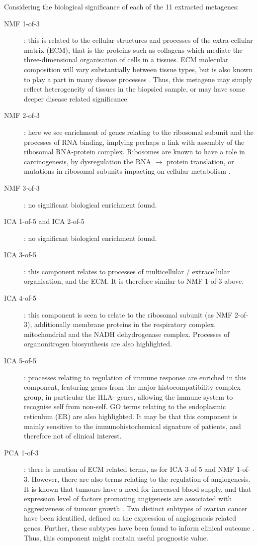 \documentclass[draft, tikz, 12pt,a4paper,oneside,fleqn]{article}
\begin{document}
Considering the biological significance of each of the 11 extracted metagenes:
\begin{description}
%
\item[NMF 1-of-3]: this is related to the cellular structures and processes of the extra-cellular matrix (ECM), that is the proteins such as collagens which mediate the three-dimensional organisation of cells in a tissues.  ECM molecular composition will vary substantially between tissue types, but is also known to play a part in many disease processes \cite{Theocharis2019}.  Thus, this metagene may simply reflect heterogeneity of tissues in the biopsied sample, or may have some deeper disease related significance.
%
\item[NMF 2-of-3]: here we see enrichment of genes relating to the ribosomal subunit and the processes of RNA binding, implying perhaps a link with assembly of the ribosomal RNA-protein complex.   Ribosomes are known to have a role in carcinogenesis, by dysregulation the RNA $\rightarrow$ protein translation, or mutations in ribosomal subunits impacting on cellular metabolism \cite{Sulima2017}.
%
\item[NMF 3-of-3]: no significant biological enrichment found.
%
\item[ICA 1-of-5 and ICA 2-of-5]: no significant biological enrichment found.
%
\item[ICA 3-of-5]: this component relates to processes of multicellular / extracellular organisation, and the ECM.  It is therefore similar to NMF 1-of-3 above.
\item[ICA 4-of-5]: this component is seen to relate to the ribosomal subunit (as NMF 2-of-3), additionally membrane proteins in the respiratory complex, mitochondrial and the NADH dehydrogenase complex.  Processes of organonitrogen biosynthesis are also highlighted. 
%
\item[ICA 5-of-5]: processes relating to regulation of immune response are enriched in this component, featuring genes from the major histocompatibility complex group, in particular the HLA- genes, allowing the immune system to recognise self from non-self.  GO terms relating to the endoplasmic reticulum (ER) are also highlighted.  It may be that this component is mainly sensitive to the immunohistochemical signature of patients, and therefore not of clinical interest.
%
\item[PCA 1-of-3]: there is mention of ECM related terms, as for ICA 3-of-5 and NMF 1-of-3.   However, there are also terms relating to the regulation of angiogenesis.  It is known that tumours have a need for increased blood supply, and that expression level of factors promoting angigenesis are associated with aggresiveness of tumour growth \cite{Nishida2006}.  Two distinct subtypes of ovarian cancer have been identified, defined on the expression of angiogenesis related genes.  Further, these subtypes have been found to inform clinical outcome \cite{Glass2015}.  Thus, this component might contain useful prognostic value.

\end{description}
\end{document}
